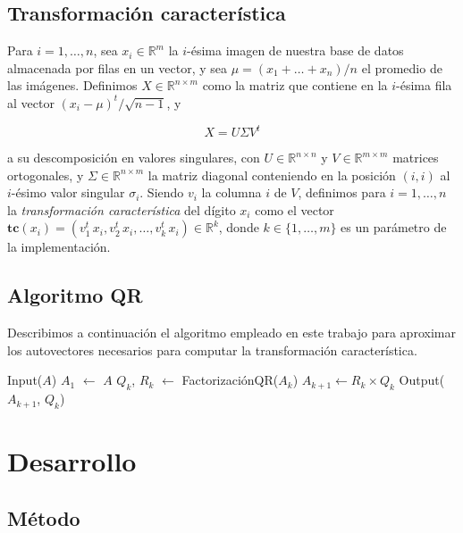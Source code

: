 \documentclass[a4paper,10pt,twoside]{article}
\newcommand{\real}{\mathbb{R}}
\begin{document}
\subsection{Transformación característica}

Para $i = 1,\ldots, n$, sea $x_i \in \real^{m}$ la $i$-\'esima imagen de nuestra base de datos almacenada por filas en un vector, y sea $\mu = (x_1 + \ldots + x_n)/n$ el promedio de las im\'agenes. Definimos $X\in\real^{n\times m}$ como la matriz que contiene en la $i$-\'esima fila al vector $(x_i - \mu)^{t}/\sqrt{n-1}$, y

$$X=U \Sigma V^t$$

a su descomposici\'on en valores singulares, con $U\in\real^{n\times n}$ y $V\in\real^{m\times m}$ matrices ortogonales, y $\Sigma\in\real^{n\times m}$ la matriz diagonal conteniendo en la posici\'on $(i,i)$ al $i$-\'esimo valor singular $\sigma_i$.
Siendo $v_i$ la columna $i$ de $V$, definimos para $i = 1,\ldots,n$ la \textsl{transformaci\'on caracter\'istica} del d\'igito $x_{i}$ como el vector $\mathbf{tc}(x_i) = (v_1^t\, x_i, v_2^t\, x_i,\ldots,v_k^t\, x_i) \in\real^k$, donde $k \in\{1,\ldots,m\}$ es un par\'ametro de la implementaci\'on.


\subsection{Algoritmo QR}

Describimos a continuación el algoritmo empleado en este trabajo para aproximar los autovectores necesarios para computar la transformación característica.

\begin{algorithmic}
  \STATE Input($A$)
  \STATE $A_1$ $\leftarrow$ $A$
    \STATE $Q_k$, $R_k$ $\leftarrow$ FactorizaciónQR($A_k$)
    \STATE $A_{k+1} \leftarrow R_k \times Q_k$
  \ENDWHILE
  \STATE Output($A_{k+1}$, $Q_k$)
\end{algorithmic}




\section{Desarrollo}


\subsection{Método}
\end{document}
